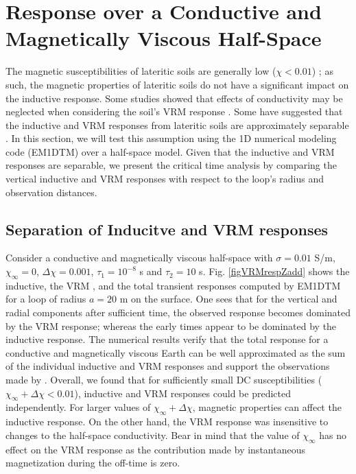 \documentclass[onecolumn]{IEEEtran} %
\begin{document}
\section{Response over a Conductive and Magnetically Viscous Half-Space}
\label{secEMversusVRM}

The magnetic susceptibilities of lateritic soils are generally low ($\chi < 0.01$) \cite{vanDam2004,vanDam2005,Druyts2009}; as such, the magnetic properties of lateritic soils do not have a significant impact on the inductive response. Some studies showed that effects of conductivity may be neglected when considering the soil's VRM response \cite{Billings2003,Druyts2009,Das2006}. Some have suggested that the inductive and VRM responses from lateritic soils are approximately separable \cite{Pasion2007,Buselli1982,Das2006}. In this section, we will test this assumption using the 1D numerical modeling code (EM1DTM) \cite{EM1DTM} over a half-space model. Given that the inductive and VRM responses are separable, we present the critical time analysis by comparing the vertical inductive and VRM responses with respect to the loop's radius and observation distances.





\subsection{Separation of Inducitve and VRM responses}
\label{secSeparable} Consider a conductive and magnetically viscous half-space with $\sigma = 0.01$ S/m, $\chi_\infty = 0$, $\Delta \chi = 0.001$, $\tau_1 = 10^{-8}$ s and $\tau_2 = 10$ s. Fig. \ref{figVRMrespZadd} shows the inductive, the VRM , and the total transient responses computed by EM1DTM for a loop of radius $a=20$ m on the surface. One sees that for the vertical and radial components after sufficient time, the observed response becomes dominated by the VRM response; whereas the early times appear to be dominated by the inductive response. The numerical results verify that the total response for a conductive and magnetically viscous Earth can be well approximated as the sum of the individual inductive and VRM responses and support the observations made by \cite{vanDam2004, vanDam2005,Druyts2009, Billings2003,Das2006,Pasion2007,Buselli1982}. Overall, we found that for sufficiently small DC susceptibilities ($\chi_\infty + \Delta \chi < 0.01$), inductive and VRM responses could be predicted independently. For larger values of $\chi_\infty + \Delta \chi$, magnetic properties can affect the inductive response. On the other hand, the VRM response was insensitive to changes to the half-space conductivity. Bear in mind that the value of $\chi_\infty$ has no effect on the VRM response as the contribution made by instantaneous magnetization during the off-time is zero.
\end{document}
